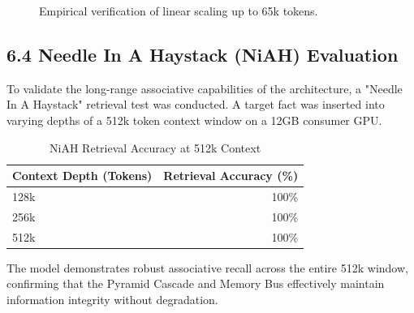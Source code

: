 \documentclass[a4paper,12pt]{article}
\begin{document}
\begin{figure}[h]
    \centering
    
    \vspace{1cm}
    
    \caption{Empirical verification of linear scaling up to 65k tokens.}
    \label{fig:scaling}
\end{figure}

\subsection*{6.4 Needle In A Haystack (NiAH) Evaluation}
To validate the long-range associative capabilities of the architecture, a "Needle In A Haystack" retrieval test was conducted. A target fact was inserted into varying depths of a 512k token context window on a 12GB consumer GPU.

\begin{table}[h]
    \centering
    \caption{NiAH Retrieval Accuracy at 512k Context}
    \label{tab:niah}
    \begin{tabular}{lr}
        \toprule
        Context Depth (Tokens) & Retrieval Accuracy (\%) \\
        \midrule
        128k & 100\% \\
        256k & 100\% \\
        512k & 100\% \\
        \bottomrule
    \end{tabular}
\end{table}

The model demonstrates robust associative recall across the entire 512k window, confirming that the Pyramid Cascade and Memory Bus effectively maintain information integrity without degradation.
\end{document}
